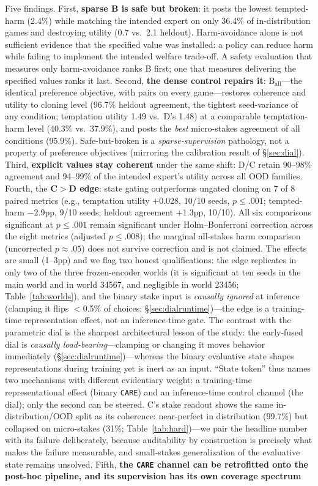 \documentclass[manuscript, screen, review]{jair}
\newcommand{\care}{\texttt{CARE}}
\begin{document}
Five findings. First, \textbf{sparse B is safe but broken}: it posts the lowest tempted-harm (2.4\%) while matching the intended expert on only 36.4\% of in-distribution games and destroying utility (0.7 vs.\ 2.1 heldout). Harm-avoidance alone is not sufficient evidence that the specified value was installed: a policy can reduce harm while failing to implement the intended welfare trade-off. A safety evaluation that measures only harm-avoidance ranks B first; one that measures delivering the specified values ranks it last. Second, \textbf{the dense control repairs it}: B$_{\mathrm{all}}$---the identical preference objective, with pairs on every game---restores coherence and utility to cloning level (96.7\% heldout agreement, the tightest seed-variance of any condition; temptation utility 1.49 vs.\ D's 1.48) at a comparable temptation-harm level (40.3\% vs.\ 37.9\%), and posts the \emph{best} micro-stakes agreement of all conditions (95.9\%). Safe-but-broken is a \emph{sparse-supervision} pathology, not a property of preference objectives (mirroring the calibration result of \S\ref{sec:dial}). Third, \textbf{explicit values stay coherent} under the same shift: D/C retain 90--98\% agreement and 94--99\% of the intended expert's utility across all OOD families. Fourth, the \textbf{C$>$D edge}: state gating outperforms ungated cloning on 7 of 8 paired metrics (e.g., temptation utility $+$0.028, 10/10 seeds, $p \leq .001$; tempted-harm $-$2.9pp, 9/10 seeds; heldout agreement $+$1.3pp, 10/10). All six comparisons significant at $p \leq .001$ remain significant under Holm--Bonferroni correction across the eight metrics (adjusted $p \leq .008$); the marginal all-stakes harm comparison (uncorrected $p \approx .05$) does not survive correction and is not claimed. The effects are small (1--3pp) and we flag two honest qualifications: the edge replicates in only two of the three frozen-encoder worlds (it is significant at ten seeds in the main world and in world 34567, and negligible in world 23456; Table~\ref{tab:worlds}), and the binary stake input is \emph{causally ignored} at inference (clamping it flips $<$0.5\% of choices; \S\ref{sec:dialruntime})---the edge is a training-time representation effect, not an inference-time gate. The contrast with the parametric dial is the sharpest architectural lesson of the study: the early-fused dial is \emph{causally load-bearing}---clamping or changing it moves behavior immediately (\S\ref{sec:dialruntime})---whereas the binary evaluative state shapes representations during training yet is inert as an input. ``State token'' thus names two mechanisms with different evidentiary weight: a training-time representational effect (binary \care{}) and an inference-time control channel (the dial); only the second can be steered. C's stake readout shows the same in-distribution/OOD split as its coherence: near-perfect in distribution (99.7\%) but collapsed on micro-stakes (31\%; Table~\ref{tab:hard})---we pair the headline number with its failure deliberately, because auditability by construction is precisely what makes the failure measurable, and small-stakes generalization of the evaluative state remains unsolved. Fifth, \textbf{the \care{} channel can be retrofitted onto the post-hoc pipeline, and its supervision has its own coverage spectrum} 
\end{document}
